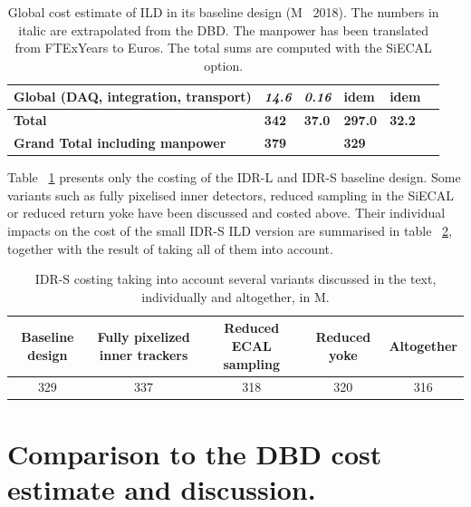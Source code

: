 \begin{table}[h!]
\begin{tabular}{ l p{0.15\hsize}p{0.15\hsize}p{0.15\hsize} p{0.15\hsize}p{0.15\hsize}}
\bf{Global (DAQ, integration, transport)}  &\bf{\it14.6} &\bf{\it0.16}& \bf{idem}& \bf{idem}\\
\midrule
\bf{Total} & \bf{342}   &  \bf{37.0}  & \bf{297.0} & \bf{32.2}  \\
\midrule
\bf{Grand Total including manpower}    & \bf{379}   &    & \bf{329} &   \\
 \bottomrule
\end{tabular}
\caption{\label{cost_summary}Global cost estimate of ILD in its baseline design (M\texteuro~ 2018). The numbers in italic are extrapolated from the DBD. The manpower has been translated from FTExYears to Euros. The total sums are computed with the SiECAL option.
}
\end{table}
Table ~\ref{cost_summary} presents only the costing of the IDR-L and IDR-S baseline design. Some variants such as fully pixelised inner detectors, reduced sampling in the SiECAL or reduced return yoke have been discussed and costed above. Their individual impacts on the cost of the small IDR-S ILD version are summarised in table ~\ref{cost_variants}, together with the result of taking all of them into account.
\begin{table}[h!]\hspace*{-0cm}\small
\begin{tabular}{ccccc}
\toprule
\bf {Baseline design} & \bf Fully pixelized inner trackers &  \bf Reduced ECAL sampling&\bf Reduced yoke&\bf Altogether\\
\midrule
329&337&318&320&316\\
\bottomrule
\end{tabular}
\caption{\label{cost_variants}IDR-S costing taking into account several variants discussed in the text, individually and altogether, in M\texteuro.}
\end{table}

\section{Comparison to the DBD cost estimate and discussion.}
 
